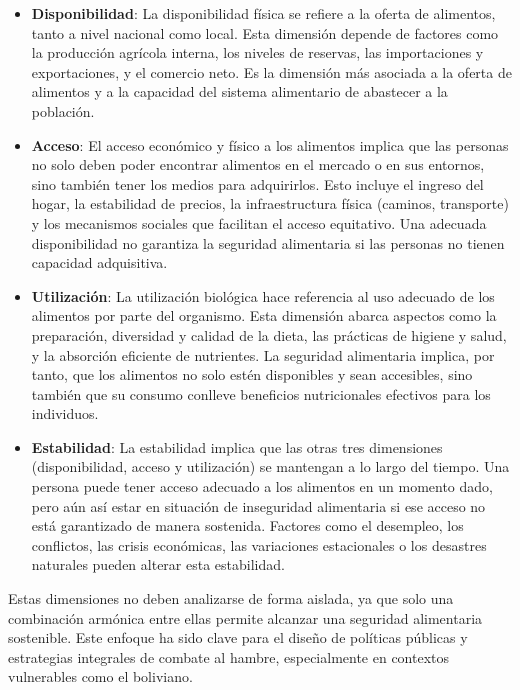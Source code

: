 \documentclass[Royal,times,sageh]{sagej}
\begin{document}
\begin{itemize}
\item
  \textbf{Disponibilidad}: La disponibilidad física se refiere a la
  oferta de alimentos, tanto a nivel nacional como local. Esta dimensión
  depende de factores como la producción agrícola interna, los niveles
  de reservas, las importaciones y exportaciones, y el comercio neto. Es
  la dimensión más asociada a la oferta de alimentos y a la capacidad
  del sistema alimentario de abastecer a la población.
\item
  \textbf{Acceso}: El acceso económico y físico a los alimentos implica
  que las personas no solo deben poder encontrar alimentos en el mercado
  o en sus entornos, sino también tener los medios para adquirirlos.
  Esto incluye el ingreso del hogar, la estabilidad de precios, la
  infraestructura física (caminos, transporte) y los mecanismos sociales
  que facilitan el acceso equitativo. Una adecuada disponibilidad no
  garantiza la seguridad alimentaria si las personas no tienen capacidad
  adquisitiva.
\item
  \textbf{Utilización}: La utilización biológica hace referencia al uso
  adecuado de los alimentos por parte del organismo. Esta dimensión
  abarca aspectos como la preparación, diversidad y calidad de la dieta,
  las prácticas de higiene y salud, y la absorción eficiente de
  nutrientes. La seguridad alimentaria implica, por tanto, que los
  alimentos no solo estén disponibles y sean accesibles, sino también
  que su consumo conlleve beneficios nutricionales efectivos para los
  individuos.
\item
  \textbf{Estabilidad}: La estabilidad implica que las otras tres
  dimensiones (disponibilidad, acceso y utilización) se mantengan a lo
  largo del tiempo. Una persona puede tener acceso adecuado a los
  alimentos en un momento dado, pero aún así estar en situación de
  inseguridad alimentaria si ese acceso no está garantizado de manera
  sostenida. Factores como el desempleo, los conflictos, las crisis
  económicas, las variaciones estacionales o los desastres naturales
  pueden alterar esta estabilidad.
\end{itemize}

Estas dimensiones no deben analizarse de forma aislada, ya que solo una
combinación armónica entre ellas permite alcanzar una seguridad
alimentaria sostenible. Este enfoque ha sido clave para el diseño de
políticas públicas y estrategias integrales de combate al hambre,
especialmente en contextos vulnerables como el boliviano.
\end{document}
